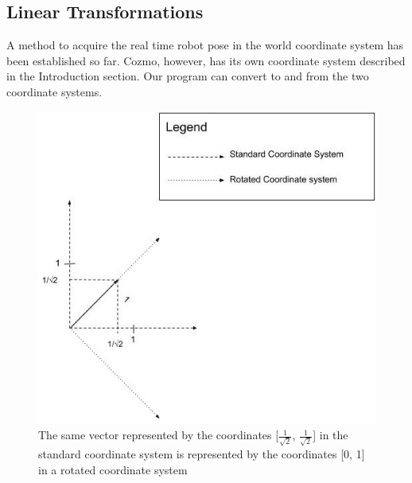 \documentclass[jou,apacite]{apa6}
\begin{document}
\subsection{Linear Transformations}
A method to acquire the real time robot pose in the world coordinate system has been established so far. Cozmo, however, has its own coordinate system described in the Introduction section. Our program can convert to and from the two coordinate systems.

\begin{figure}
	\includegraphics[width=\linewidth]{rotation_difference.jpg}
	\caption{The same vector represented by the coordinates [$\frac{1}{\sqrt2}$, $\frac{1}{\sqrt2}$] in the standard coordinate system is represented by the coordinates [0, 1] in a rotated coordinate system}
	\label{fig:rotdiff}
\end{figure}
\end{document}
